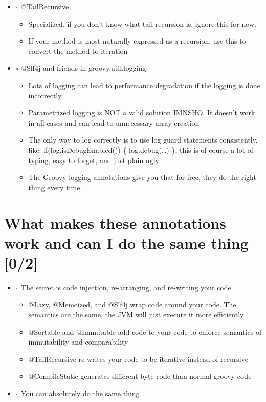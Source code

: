 \documentclass[11pt]{article}
\begin{document}
\begin{itemize}
\item $\square$ @TailRecursive

\begin{itemize}
\item Specialized, if you don't know what tail recursion is, ignore this for now.

\item If your method is most naturally expressed as a recursion, use this to convert the method to iteration
\end{itemize}

\item $\square$ @Slf4j and friends in groovy.util.logging

\begin{itemize}
\item Lots of logging can lead to performance degradation if the logging is done incorrectly

\item Parametrized logging is NOT a valid solution IMNSHO. It doesn't work in all cases and can lead to unnecessary array creation

\item The only way to log correctly is to use log guard statements consistently, like: if(log.isDebugEnabled()) \{ log.debug(\ldots{}) \}, this is of course a lot of typing, easy to forget, and just plain ugly

\item The Groovy logging annotations give you that for free, they do the right thing every time.
\end{itemize}
\end{itemize}

\section{What makes these annotations work and can I do the same thing [0/2]}
\label{sec:orgheadline6}

\begin{itemize}
\item $\square$ The secret is code injection, re-arranging, and re-writing your code

\begin{itemize}
\item @Lazy, @Memoized, and @Slf4j wrap code around your code. The semantics are the same, the JVM will just execute it more efficiently

\item @Sortable and @Immutable add code to your code to enforce semantics of immutability and comparability

\item @TailRecursive re-writes your code to be iterative instead of recursive

\item @CompileStatic generates different byte code than normal groovy code
\end{itemize}

\item $\square$ You can absolutely do the same thing
\end{itemize}
\end{document}
